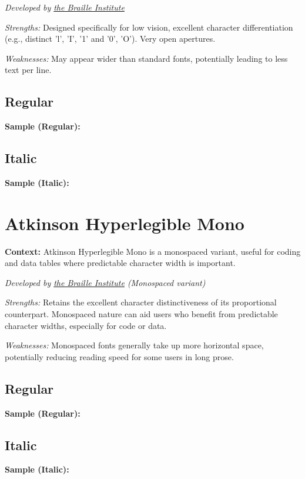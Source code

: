 \emph{Developed by \href{https://brailleinstitute.org/freefont}{the Braille Institute}}
\begin{raggedright}
\emph{Strengths:} Designed specifically for low vision, excellent character differentiation (e.g., distinct 'l', 'I', '1' and '0', 'O'). Very open apertures.

\emph{Weaknesses:} May appear wider than standard fonts, potentially leading to less text per line.

\subsection{Regular}\label{subsec:atkinson-regular}
\noindent\textbf{Sample (Regular):}
\FontSample{\atkinsonhyperlegiblefont}

\subsection{Italic}\label{subsec:atkinson-italic}
\noindent\textbf{Sample (Italic):}
\FontSample{{\atkinsonhyperlegiblefont\itshape}}
\end{raggedright}


\pagebreak
\section{Atkinson Hyperlegible Mono}\label{sec:atkinson-mono}
\noindent
\textbf{Context:} Atkinson Hyperlegible Mono is a monospaced variant, useful for coding and data tables where predictable character width is important.

\emph{Developed by \href{https://brailleinstitute.org/freefont}{the Braille Institute} (Monospaced variant)}
\begin{raggedright}
\emph{Strengths:} Retains the excellent character distinctiveness of its proportional counterpart. Monospaced nature can aid users who benefit from predictable character widths, especially for code or data.

\emph{Weaknesses:} Monospaced fonts generally take up more horizontal space, potentially reducing reading speed for some users in long prose.

\subsection{Regular}\label{subsec:mono-regular}
\noindent\textbf{Sample (Regular):}
\FontSample{\atkinsonmonofont}

\subsection{Italic}\label{subsec:mono-italic}
\noindent\textbf{Sample (Italic):}
\FontSample{{\atkinsonmonofont\itshape}}
\end{raggedright}


